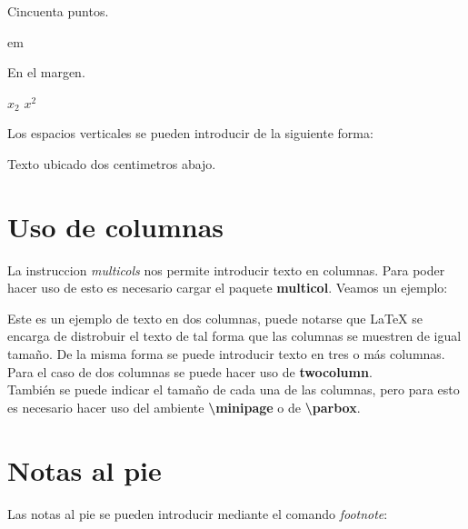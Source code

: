 \documentclass[letterpaper,12pt]{report}
\begin{document}
\hspace{50pt}Cincuenta puntos.

\hspace{3em} em

\hspace{-3cm}En el margen.

$x_{2}$ \hspace{4cm} $x^{2}$

Los espacios verticales se pueden introducir de la siguiente forma:

\vspace{2cm}Texto ubicado dos centimetros abajo.


\vspace{3cm}

\newpage
\chapter{Uso de columnas}

La instruccion \textit{multicols} nos permite introducir texto en columnas. Para poder hacer uso de esto es necesario cargar el paquete \textbf{multicol}. Veamos un ejemplo:

\begin{multicols}{4}
Este es  un ejemplo de texto en dos columnas, puede notarse que \LaTeX{} se encarga de distrobuir el texto de tal forma que las columnas se muestren de igual tamaño. De la misma forma se puede introducir texto en tres o más columnas.\\
Para el caso de dos columnas se puede hacer uso de \textbf{twocolumn}.\\
También se puede indicar el tamaño de cada una de las columnas, pero para esto es necesario hacer uso del ambiente \textbf{\textbackslash minipage} 
o de \textbf{\textbackslash parbox}.
\end{multicols}

\pagebreak

\chapter{Notas al pie}

Las notas al pie se pueden introducir mediante el comando \textit{footnote}:
\end{document}
